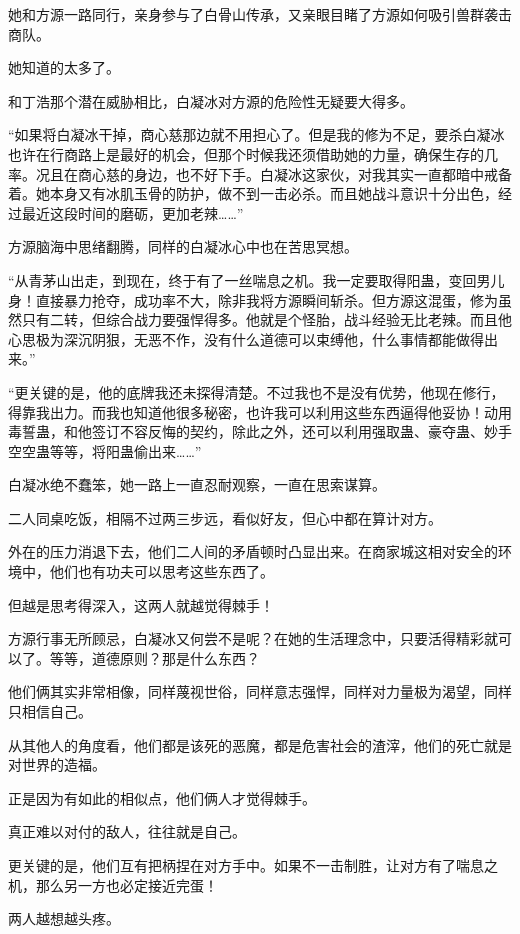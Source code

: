 \begin{this_body}
她和方源一路同行，亲身参与了白骨山传承，又亲眼目睹了方源如何吸引兽群袭击商队。

她知道的太多了。

和丁浩那个潜在威胁相比，白凝冰对方源的危险性无疑要大得多。

“如果将白凝冰干掉，商心慈那边就不用担心了。但是我的修为不足，要杀白凝冰也许在行商路上是最好的机会，但那个时候我还须借助她的力量，确保生存的几率。况且在商心慈的身边，也不好下手。白凝冰这家伙，对我其实一直都暗中戒备着。她本身又有冰肌玉骨的防护，做不到一击必杀。而且她战斗意识十分出色，经过最近这段时间的磨砺，更加老辣……”

方源脑海中思绪翻腾，同样的白凝冰心中也在苦思冥想。

“从青茅山出走，到现在，终于有了一丝喘息之机。我一定要取得阳蛊，变回男儿身！直接暴力抢夺，成功率不大，除非我将方源瞬间斩杀。但方源这混蛋，修为虽然只有二转，但综合战力要强悍得多。他就是个怪胎，战斗经验无比老辣。而且他心思极为深沉阴狠，无恶不作，没有什么道德可以束缚他，什么事情都能做得出来。”

“更关键的是，他的底牌我还未探得清楚。不过我也不是没有优势，他现在修行，得靠我出力。而我也知道他很多秘密，也许我可以利用这些东西逼得他妥协！动用毒誓蛊，和他签订不容反悔的契约，除此之外，还可以利用强取蛊、豪夺蛊、妙手空空蛊等等，将阳蛊偷出来……”

白凝冰绝不蠢笨，她一路上一直忍耐观察，一直在思索谋算。

二人同桌吃饭，相隔不过两三步远，看似好友，但心中都在算计对方。

外在的压力消退下去，他们二人间的矛盾顿时凸显出来。在商家城这相对安全的环境中，他们也有功夫可以思考这些东西了。

但越是思考得深入，这两人就越觉得棘手！

方源行事无所顾忌，白凝冰又何尝不是呢？在她的生活理念中，只要活得精彩就可以了。等等，道德原则？那是什么东西？

他们俩其实非常相像，同样蔑视世俗，同样意志强悍，同样对力量极为渴望，同样只相信自己。

从其他人的角度看，他们都是该死的恶魔，都是危害社会的渣滓，他们的死亡就是对世界的造福。

正是因为有如此的相似点，他们俩人才觉得棘手。

真正难以对付的敌人，往往就是自己。

更关键的是，他们互有把柄捏在对方手中。如果不一击制胜，让对方有了喘息之机，那么另一方也必定接近完蛋！

两人越想越头疼。


\end{this_body}
